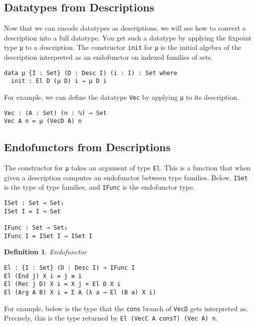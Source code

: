 \documentclass[preprint,nonatbib]{sigplanconf}
\newtheorem{definition}{Definition}
\begin{document}
\subsection{Datatypes from Descriptions}

Now that we can encode datatypes as descriptions, we will see how to
convert a description into a full datatype. You get such a datatype by
applying the fixpoint type {\tt μ} to a description.
The constructor {\tt init}
for {\tt μ} is the initial algebra of the description interpreted as
an endofunctor on indexed families of sets.

\begin{verbatim}
data μ {I : Set} (D : Desc I) (i : I) : Set where
  init : El D (μ D) i → μ D i
\end{verbatim}

For example, we can define the datatype {\tt Vec} by applying
{\tt μ} to its description.

\begin{verbatim}
Vec : (A : Set) (n : ℕ) → Set
Vec A n = μ (VecD A) n
\end{verbatim}

\subsection{Endofunctors from Descriptions}

The constructor for {\tt μ} takes an argument of type {\tt El}.
This is a function that when given a description computes an
endofunctor between type families. Below, {\tt ISet} is the type of
type families, and {\tt IFunc} is the endofunctor type.

\begin{verbatim}
ISet : Set → Set₁
ISet I = I → Set

IFunc : Set → Set₁
IFunc I = ISet I → ISet I
\end{verbatim}

\begin{definition}\label{def:el}
Endofunctor

\begin{verbatim}
El : {I : Set} (D : Desc I) → IFunc I
El (End j) X i = j ≡ i
El (Rec j D) X i = X j × El D X i
El (Arg A B) X i = Σ A (λ a → El (B a) X i)
\end{verbatim}

\end{definition}

For example, below is the type that the {\tt cons} branch of
{\tt VecD} gets interpreted as. Precisely, this is the type returned
by {\tt El (VecC A consT) (Vec A) n}.
\end{document}
